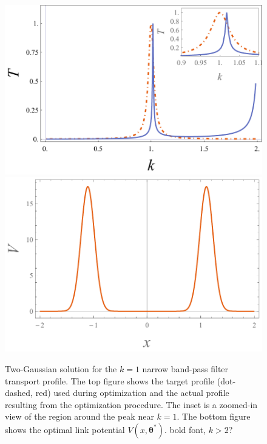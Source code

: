 \documentclass[twocolumn,amsmath,amssymb,showpacs,prl,superscriptaddress,aps]{revtex4-1}
\begin{document}
\begin{figure}
   \includegraphics[width=1\linewidth]{figures/plot_transport_profiles.pdf}
   \includegraphics[width=1\linewidth]{figures/plot_link_potential.pdf}
 \caption[Narrow band-pass filter link potential]{Two-Gaussian solution for the $k=1$ narrow band-pass filter transport profile. The top figure shows the target profile (dot-dashed, red) used during optimization and the actual profile resulting from the optimization procedure. The inset is a zoomed-in view of the region around the peak near $k=1$. The bottom figure shows the optimal link potential $V(x, \bm{\theta^*})$. {\color{blue} bold font, $k>2$?}}
 \label{fig:method_illustration}
\end{figure}

\end{document}
